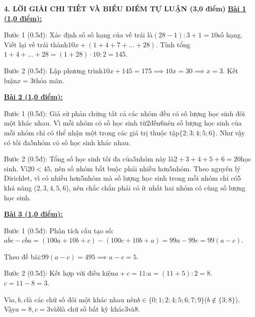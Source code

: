 \documentclass[11pt,a4paper]{article}
\begin{document}
\noindent\textbf{\large 4. LỜI GIẢI CHI TIẾT VÀ BIỂU ĐIỂM TỰ LUẬN (3,0 điểm)}
\vspace{4pt}
\noindent\textbf{\underline{Bài 1 (1,0 điểm):}}\par\vspace{3pt}
Bước 1 (0.5đ): Xác định số số hạng của vế trái là$(28 - 1) : 3 + 1 = 10$số hạng. Viết lại vế trái thành$10x + (1 + 4 + 7 + \dots + 28)$. Tính tổng$1 + 4 + \dots + 28 = (1 + 28) \cdot 10 : 2 = 145$.\par\noindent Bước 2 (0.5đ): Lập phương trình$10x + 145 = 175 \implies 10x = 30 \implies x = 3$. Kết luận$x = 3$thỏa mãn.\par\vspace{8pt}

\noindent\textbf{\underline{Bài 2 (1,0 điểm):}}\par\vspace{3pt}
Bước 1 (0.5đ): Giả sử phản chứng tất cả các nhóm đều có số lượng học sinh đôi một khác nhau. Vì mỗi nhóm có số học sinh từ$2$đến$6$nên số lượng học sinh của mỗi nhóm chỉ có thể nhận một trong các giá trị thuộc tập$\{2; 3; 4; 5; 6\}$. Như vậy có tối đa$5$nhóm có số học sinh khác nhau.\par\noindent Bước 2 (0.5đ): Tổng số học sinh tối đa của$5$nhóm này là$2 + 3 + 4 + 5 + 6 = 20$học sinh. Vì$20 < 45$, nên số nhóm bắt buộc phải nhiều hơn$5$nhóm. Theo nguyên lý Dirichlet, vì có nhiều hơn$5$nhóm mà số lượng học sinh trong mỗi nhóm chỉ có$5$khả năng ($2, 3, 4, 5, 6$), nên chắc chắn phải có ít nhất hai nhóm có cùng số lượng học sinh.\par\vspace{8pt}

\noindent\textbf{\underline{Bài 3 (1,0 điểm):}}\par\vspace{3pt}
Bước 1 (0.5đ): Phân tích cấu tạo số:$\overline{abc} - \overline{cba} = (100a + 10b + c) - (100c + 10b + a) = 99a - 99c = 99(a - c)$.\par\noindent Theo đề bài:$99(a - c) = 495 \implies a - c = 5$.\par\noindent Bước 2 (0.5đ): Kết hợp với điều kiện$a + c = 11$:$a = (11 + 5) : 2 = 8$.$c = 11 - 8 = 3$.\par\noindent Vì$a, b, c$là các chữ số đôi một khác nhau nên$b \in \{0; 1; 2; 4; 5; 6; 7; 9\}$($b \notin \{3; 8\}$). Vậy$a = 8, c = 3$và$b$là chữ số bất kỳ khác$3$và$8$.\par\vspace{8pt}
\end{document}
